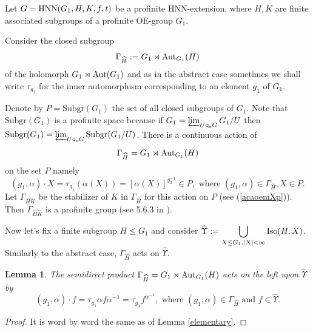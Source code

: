 \documentclass[a4paper,12pt]{article}
\newtheorem{lem}[thm]{Lemma}
\def\aut {{\rm Aut}}
\def\hnn {{\rm HNN}}
\def\Iso {{\rm Iso}}
\begin{document}
{Let $G=\hnn(G_1, H, K, f, t)$ be a profinite HNN-extension, where $H, K$ are finite associated subgroups of a profinite OE-group $G_1$. 

  Consider the closed subgroup 
 \begin{equation} \label{gamma H2} 
 \Gamma_{\widehat H}:=G_1 \rtimes \aut_{G_1}(H)\end{equation} of the holomorph $G_1\rtimes \aut(G_1)$ and as in the abstract case sometimes we shall write $\tau_{g_1}$ for the inner automorphism corresponding to an element $g_1$ of $G_1$. 

Denote by $P=\mbox{Subgr}(G_1)$ the set of all closed subgroups of $G_1.$ Note that $\mbox{Subgr}(G_1)$ is a profinite space because if $G_1=\varprojlim_{U\triangleleft_o G}  G_1/U$ then $\mbox{Subgr}(G_1) = \varprojlim_{U\triangleleft_o G}  \mbox{Subgr}(G_1/U)$. 
There is a continuous action of $$\Gamma_{\widehat{H}}=G_1\rtimes \aut_{G_1}(H)$$ on the set $P$ namely \begin{equation} \label{acaoemXp} (g_1,\alpha)\cdot X= \tau_{g_1}(\alpha(X))=\left[\alpha(X)\right]^{g_1^{-1}} \in P, \mbox{ where } (g_1,\alpha) \in \Gamma_{\widehat{H}}, X \in P. \end{equation}
 Let $\Gamma_{\widehat{HK}}$ be the stabilizer of $K$ in $\Gamma_{\widehat{H}}$ for this action on $P$ (see (\ref{acaoemXp})). Then $\Gamma_{\widehat{HK}}$ is a profinite group (see 5.6.3 in \cite{RZ}).
 
 
 
 Now let's fix a finite subgroup $H\leq G_1$ and consider 
$\widehat{\Upsilon} :=\displaystyle\bigcup_{X \leq G_1, |X|<\infty} \Iso(H,X)$.  Similarly to the abstract case, $\Gamma_{\widehat{H}}$ acts on $\widehat{\Upsilon}$.


\begin{lem}\label{elementaryp}
The semidirect product  $\Gamma_{\widehat{H}}=G_1 \rtimes \aut_{G_1}(H)$
acts on the left upon $\widehat{\Upsilon}$ by
\begin{equation} \label{acaosemidiretap} (g_1,\alpha) \cdot f=\tau_{g_1} \alpha f \alpha^{-1} = \tau_{g_1} f^{\alpha^{-1}}, \mbox{ where } (g_1,\alpha) \in \Gamma_{\widehat{H}} \mbox{ 
 and } f \in \widehat\Upsilon.
 \end{equation}
\end{lem}
\begin{proof} It is word by word the same as of Lemma \ref{elementary}. 
\end{proof}
 
}
\end{document}
